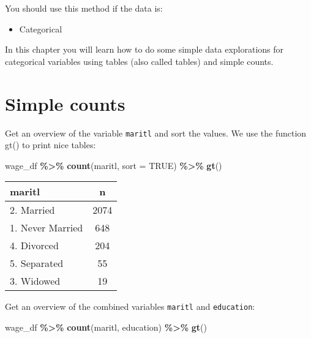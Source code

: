 \documentclass[
]{book}
\newenvironment{Shaded}{\begin{snugshade}}{\end{snugshade}}
\newcommand{\DataTypeTok}[1]{\textcolor[rgb]{0.13,0.29,0.53}{#1}}
\newcommand{\KeywordTok}[1]{\textcolor[rgb]{0.13,0.29,0.53}{\textbf{#1}}}
\newcommand{\NormalTok}[1]{#1}
\newcommand{\OperatorTok}[1]{\textcolor[rgb]{0.81,0.36,0.00}{\textbf{#1}}}
\newcommand{\OtherTok}[1]{\textcolor[rgb]{0.56,0.35,0.01}{#1}}
\newcommand{\StringTok}[1]{\textcolor[rgb]{0.31,0.60,0.02}{#1}}
\providecommand{\tightlist}{%
  \setlength{\itemsep}{0pt}\setlength{\parskip}{0pt}}
\begin{document}
You should use this method if the data is:

\begin{itemize}
\tightlist
\item
  Categorical
\end{itemize}

In this chapter you will learn how to do some simple data explorations for categorical variables using tables (also called tables) and simple counts.

\hypertarget{simple-counts}{%
\section{Simple counts}\label{simple-counts}}

Get an overview of the variable \texttt{maritl} and sort the values. We use the function gt() to print nice tables:

\begin{Shaded}
\begin{Highlighting}[]
\NormalTok{wage\_df }\OperatorTok{\%\textgreater{}\%}\StringTok{ }
\StringTok{  }\KeywordTok{count}\NormalTok{(maritl,}
  \DataTypeTok{sort =} \OtherTok{TRUE}\NormalTok{) }\OperatorTok{\%\textgreater{}\%}\StringTok{ }
\StringTok{  }\KeywordTok{gt}\NormalTok{()}
\end{Highlighting}
\end{Shaded}

\captionsetup[table]{labelformat=empty,skip=1pt}
\begin{longtable}{lc}
\toprule
maritl & n \\ 
\midrule
2. Married & 2074 \\ 
1. Never Married & 648 \\ 
4. Divorced & 204 \\ 
5. Separated & 55 \\ 
3. Widowed & 19 \\ 
\bottomrule
\end{longtable}

Get an overview of the combined variables \texttt{maritl} and \texttt{education}:

\begin{Shaded}
\begin{Highlighting}[]
\NormalTok{wage\_df }\OperatorTok{\%\textgreater{}\%}\StringTok{ }
\StringTok{  }\KeywordTok{count}\NormalTok{(maritl, education) }\OperatorTok{\%\textgreater{}\%}\StringTok{ }
\StringTok{   }\KeywordTok{gt}\NormalTok{()}
\end{Highlighting}
\end{Shaded}
\end{document}
